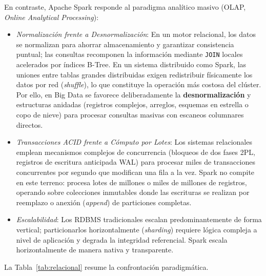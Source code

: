 \documentclass[conference,a4paper]{IEEEtran}
\begin{document}
En contraste, Apache Spark responde al paradigma analítico masivo (OLAP, \textit{Online Analytical Processing}):
\begin{itemize}
\item \textit{Normalización frente a Desnormalización}: En un motor relacional, los datos se normalizan para ahorrar almacenamiento y garantizar consistencia puntual; las consultas recomponen la información mediante \texttt{JOIN} locales acelerados por índices B-Tree. En un sistema distribuido como Spark, las uniones entre tablas grandes distribuidas exigen redistribuir físicamente los datos por red (\textit{shuffle}), lo que constituye la operación más costosa del clúster. Por ello, en Big Data se favorece deliberadamente la \textbf{desnormalización} y estructuras anidadas (registros complejos, arreglos, esquemas en estrella o copo de nieve) para procesar consultas masivas con escaneos columnares directos.
\item \textit{Transacciones ACID frente a Cómputo por Lotes}: Los sistemas relacionales emplean mecanismos complejos de concurrencia (bloqueos de dos fases 2PL, registros de escritura anticipada WAL) para procesar miles de transacciones concurrentes por segundo que modifican una fila a la vez. Spark no compite en este terreno: procesa lotes de millones o miles de millones de registros, operando sobre colecciones inmutables donde las escrituras se realizan por reemplazo o anexión (\textit{append}) de particiones completas.
\item \textit{Escalabilidad}: Los RDBMS tradicionales escalan predominantemente de forma vertical; particionarlos horizontalmente (\textit{sharding}) requiere lógica compleja a nivel de aplicación y degrada la integridad referencial. Spark escala horizontalmente de manera nativa y transparente.
\end{itemize}

La Tabla~\ref{tab:relacional} resume la confrontación paradigmática.
\end{document}
